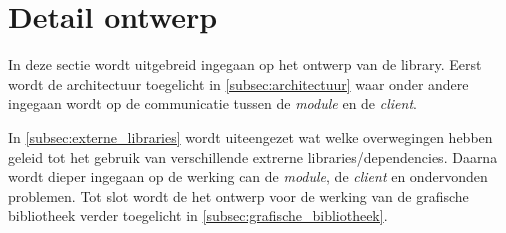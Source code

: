 \section{Detail ontwerp} \label{sec:detail}

In deze sectie wordt uitgebreid ingegaan op het ontwerp van de library. Eerst wordt de architectuur toegelicht in \autoref{subsec:architectuur} waar onder andere ingegaan wordt op de communicatie tussen de \emph{module} en de \emph{client}.

In \autoref{subsec:externe_libraries} wordt uiteengezet wat welke overwegingen hebben geleid tot het gebruik van verschillende extrerne libraries/dependencies. Daarna wordt dieper ingegaan op de werking can de \emph{module}, de \emph{client} en ondervonden problemen. Tot slot wordt de het ontwerp voor de werking van de grafische bibliotheek verder toegelicht in \autoref{subsec:grafische_bibliotheek}.






